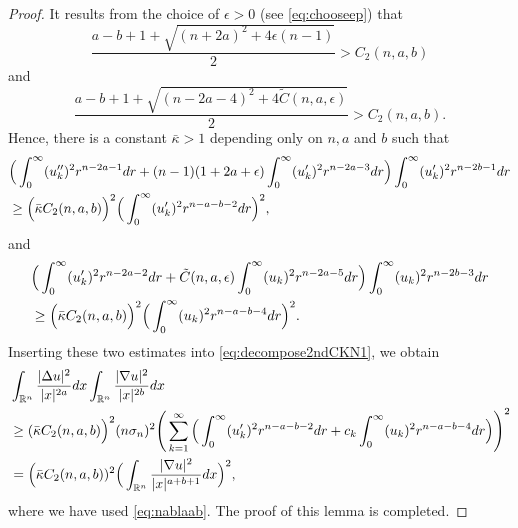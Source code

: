 \documentclass[10pt,a4paper]{amsart}
\def\R{\mathbb R}%
\def\ep{\epsilon}%
\def\irn{\int_{\R^n}}
\begin{document}
\begin{proof}
It results from the choice of $\epsilon >0$ (see \eqref{eq:chooseep}) that 
\[
\frac{a-b+1 + \sqrt{(n+2a)^2 + 4\ep(n-1)}}2 > C_2(n,a,b)
\]
and 
\[
\frac{a-b+1 + \sqrt{(n-2a-4)^2 + 4 \tilde{C}(n,a,\epsilon)}}2 > C_2(n,a,b).
\]
Hence, there is a constant $\bar{\kappa} > 1$ depending only on $n,a$ and $b$ such that
\begin{align*}
&\Big(\int_0^\infty (u_k'')^2 r^{n-2a -1} dr + (n-1)(1+2a+\epsilon)\int_0^\infty (u_k')^2 r^{n-2a -3} dr\Big)\int_0^\infty (u_k')^2 r^{n-2b -1} dr\notag\\
&\geq \Big(\bar{\kappa} C_2(n,a,b)\Big)^2 \Big(\int_0^\infty (u_k')^2 r^{n-a-b -2} dr\Big)^2,
\end{align*}
and
\begin{align*}
&\Big(\int_0^\infty (u_k')^2 r^{n-2a -2} dr +  \tilde{C}(n,a,\epsilon)\int_0^\infty (u_k)^2 r^{n-2a -5} dr\Big)\int_0^\infty (u_k)^2 r^{n-2b -3} dr\notag\\
&\geq \Big(\bar{\kappa} C_2(n,a,b)\Big)^2 \Big(\int_0^\infty (u_k)^2 r^{n-a-b -4} dr\Big)^2.
\end{align*}
Inserting these two estimates into \eqref{eq:decompose2ndCKN1}, we obtain
\begin{align*}
&\irn \frac{|\Delta u|^2}{|x|^{2a}} dx \irn \frac{|\nabla u|^2}{|x|^{2b}} dx\notag\\
&\geq (\bar{\kappa}C_2(n,a,b)\Big)^2 (n\sigma_n)^2 \Bigg(\sum_{k=1}^\infty\Big(\int_0^\infty (u_k')^2 r^{n-a-b -2} dr + c_k \int_0^\infty (u_k)^2 r^{n-a-b -4} dr\Big)\Bigg)^2\notag\\
&=\Big(\bar{\kappa}C_2(n,a,b))^2 \Big(\irn \frac{|\nabla u|^2}{|x|^{a+b+1}} dx\Big)^2,
\end{align*}
where we have used  \eqref{eq:nablaab}. The proof of this lemma is completed.
\end{proof}
\end{document}
